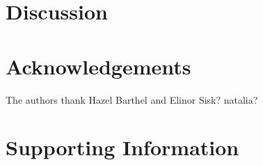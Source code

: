 \documentclass[12pt]{article}
\begin{document}
\section{Discussion}

\printbibliography
\clearpage


\section*{Acknowledgements}
The authors thank Hazel Barthel and Elinor Sisk? natalia?


\section*{Supporting Information}

\setcounter{figure}{0}
\setcounter{table}{0}


%
\end{document}
